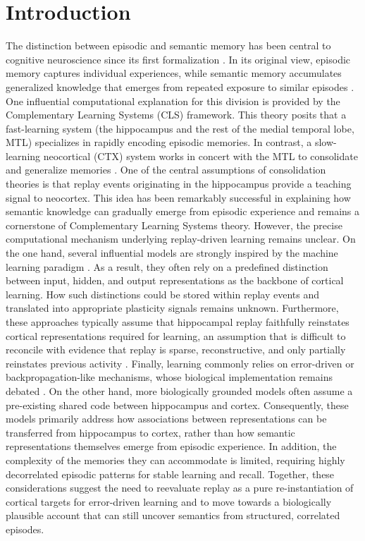 \documentclass{article}
\begin{document}
\section*{Introduction}
The distinction between episodic and semantic memory has been central to cognitive neuroscience since its first formalization . In its original view, episodic memory captures individual experiences, while semantic memory accumulates generalized knowledge that emerges from repeated exposure to similar episodes . One influential computational explanation for this division is provided by the Complementary Learning Systems (CLS) framework. This theory posits that a fast-learning system (the hippocampus and the rest of the medial temporal lobe, MTL) specializes in rapidly encoding episodic memories. In contrast, a slow-learning neocortical (CTX) system works in concert with the MTL to consolidate and generalize memories .
\newline\newline
One of the central assumptions of consolidation theories is that replay events originating in the hippocampus provide a teaching signal to neocortex. This idea has been remarkably successful in explaining how semantic knowledge can gradually emerge from episodic experience and remains a cornerstone of Complementary Learning Systems theory. However, the precise computational mechanism underlying replay-driven learning remains unclear. On the one hand, several influential models are strongly inspired by the machine learning paradigm . As a result, they often rely on a predefined distinction between input, hidden, and output representations as the backbone of cortical learning. How such distinctions could be stored within replay events and translated into appropriate plasticity signals remains unknown. Furthermore, these approaches typically assume that hippocampal replay faithfully reinstates cortical representations required for learning, an assumption that is difficult to reconcile with evidence that replay is sparse, reconstructive, and only partially reinstates previous activity . Finally, learning commonly relies on error-driven or backpropagation-like mechanisms, whose biological implementation remains debated . On the other hand, more biologically grounded models  often assume a pre-existing shared code between hippocampus and cortex. Consequently, these models primarily address how associations between representations can be transferred from hippocampus to cortex, rather than how semantic representations themselves emerge from episodic experience. In addition, the complexity of the memories they can accommodate is limited, requiring highly decorrelated episodic patterns for stable learning and recall. Together, these considerations suggest the need to reevaluate replay as a pure re-instantiation of cortical targets for error-driven learning and to move towards a biologically plausible account that can still uncover semantics from structured, correlated episodes.
\end{document}
